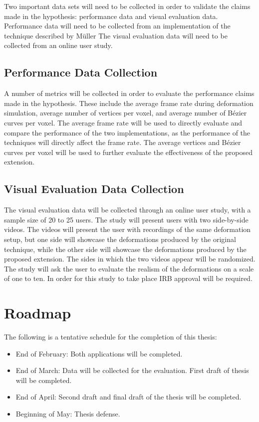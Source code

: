 Two important data sets will need to be collected in order to validate the claims made in the 
hypothesis: performance data and visual evaluation data. Performance data will need to be collected
from an implementation of the technique described by Müller \etal The visual evaluation data will
need to be collected from an online user study.

\subsection{Performance Data Collection}

A number of metrics will be collected in order to evaluate the performance claims made in the
hypothesis. These include the average frame rate during deformation simulation, average number of
vertices per voxel, and average number of Bézier curves per voxel. The average frame rate will be 
used to directly evaluate and compare the performance of the two implementations, as the 
performance of the techniques will directly affect the frame rate. The average vertices and Bézier 
curves per voxel will be used to further evaluate the effectiveness of the proposed extension.

\subsection{Visual Evaluation Data Collection}

The visual evaluation data will be collected through an online user study, with a sample size of
20 to 25 users. The study will present users with two side-by-side videos. The videos will present 
the user with recordings of the same deformation setup, but one side will showcase the deformations 
produced by the original technique, while the other side will showcase the deformations produced by 
the proposed extension. The sides in which the two videos appear will be randomized. The study will 
ask the user to evaluate the realism of the deformations on a scale of one to ten. In order for this
study to take place IRB approval will be required.

\section{Roadmap}
The following is a tentative schedule for the completion of this thesis:
\begin{itemize}
  \item End of February: Both applications will be completed.
  \item End of March: Data will be collected for the evaluation. First draft of thesis will be 
  completed.
  \item End of April: Second draft and final draft of the thesis will be completed.
  \item Beginning of May: Thesis defense.
\end{itemize}


